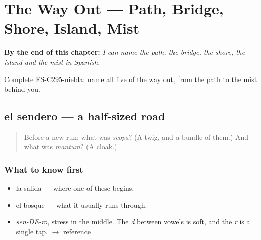 
\chapter{The Way Out --- Path, Bridge, Shore, Island, Mist}
\label{ch:el-sendero}

\begin{chapteropening}
\textbf{By the end of this chapter:} \emph{I can name the path, the bridge, the shore, the island and the mist in Spanish.}

Complete ES-C295-niebla: name all five of the way out, from the path to the mist behind you.
\end{chapteropening}

\section[el sendero]{el sendero — a half-sized road}

\label{lesson:ES-C295-sendero}



\begin{quote}
Before a new run: what was \emph{scopa}? (A twig, and a bundle of them.) And what was \emph{mantum}? (A cloak.)
\end{quote}

\subsection*{What to know first}
\begin{itemize}
\raggedright
  \item la salida — where one of these begins.
  \item el bosque — what it usually runs through.
\end{itemize}

\begin{sounds}
\begin{itemize}
\raggedright
  \item \emph{sen-DE-ro}, stress in the middle. The \emph{d} between vowels is soft, and the \emph{r} is a single tap. $\to$ reference
\end{itemize}
\end{sounds}

